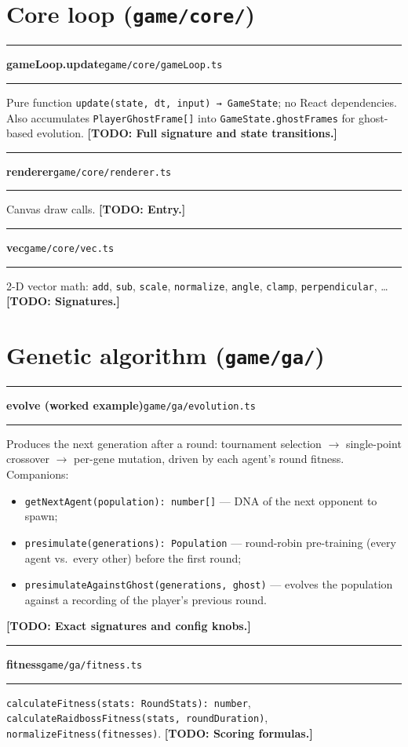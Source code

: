 \documentclass[11pt,a4paper]{report}
\newcommand{\todo}[1]{\textcolor{red!70!black}{\textbf{[TODO: #1]}}}
\newcommand{\srcfile}[1]{\texttt{\small #1}}   %
\newcommand{\ts}[1]{\texttt{#1}}               %
\newenvironment{apientry}[2]{%
  \par\medskip\noindent
  \begin{minipage}{\textwidth}
  \hrule\vspace{0.6ex}
  {\large\ttfamily\bfseries #1}\hfill{\footnotesize\srcfile{#2}}
  \vspace{0.4ex}\hrule\medskip
}{%
  \end{minipage}\par\medskip
}
\begin{document}
\section{Core loop (\srcfile{game/core/})}

\begin{apientry}{gameLoop.update}{game/core/gameLoop.ts}
Pure function \ts{update(state, dt, input) → GameState}; no React
dependencies. Also accumulates \ts{PlayerGhostFrame[]} into
\ts{GameState.ghostFrames} for ghost-based evolution.
\todo{Full signature and state transitions.}
\end{apientry}

\begin{apientry}{renderer}{game/core/renderer.ts}
Canvas draw calls. \todo{Entry.}
\end{apientry}

\begin{apientry}{vec}{game/core/vec.ts}
2-D vector math: \ts{add}, \ts{sub}, \ts{scale}, \ts{normalize},
\ts{angle}, \ts{clamp}, \ts{perpendicular}, \ldots \todo{Signatures.}
\end{apientry}

\section{Genetic algorithm (\srcfile{game/ga/})}

\begin{apientry}{evolve (worked example)}{game/ga/evolution.ts}
Produces the next generation after a round: tournament selection $\to$
single-point crossover $\to$ per-gene mutation, driven by each agent's
round fitness. Companions:
\begin{itemize}[nosep]
  \item \ts{getNextAgent(population): number[]} --- DNA of the next
        opponent to spawn;
  \item \ts{presimulate(generations): Population} --- round-robin
        pre-training (every agent vs.\ every other) before the first round;
  \item \ts{presimulateAgainstGhost(generations, ghost)} --- evolves the
        population against a recording of the player's previous round.
\end{itemize}
\todo{Exact signatures and config knobs.}
\end{apientry}

\begin{apientry}{fitness}{game/ga/fitness.ts}
\ts{calculateFitness(stats: RoundStats): number},
\ts{calculateRaidbossFitness(stats, roundDuration)},
\ts{normalizeFitness(fitnesses)}. \todo{Scoring formulas.}
\end{apientry}
\end{document}
